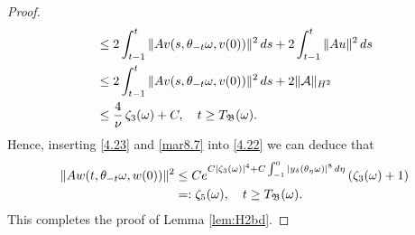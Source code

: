 \documentclass[10pt,a4paper]{amsart}
\renewcommand{\d}{{\rm{d}}}
\begin{document}
\begin{proof}
\begin{align}
&\leq2\int_{t-1}^t\|A\textbf{v}(s,\theta_{-t}\omega,\textbf{v}(0))\|^2\, \d s+2\int_{t-1}^t\|A\textbf{u}\|^2\, \d s\nonumber\\
&\leq  2\int_{t-1}^t \|A\textbf{v}(s,\theta_{-t}\omega,\textbf{v}(0))\|^2\, \d s  +  2\|\mathcal A \|_{H^2} \nonumber\\
&\leq \frac 4  \nu \, \zeta_3(\omega) +C ,  \quad t\geq T_{\mathfrak B}(\omega).  \label{mar8.7}
\end{align}
Hence, inserting \eqref{4.23} and \eqref{mar8.7} into \eqref{4.22} we can deduce that
\begin{align}
\|Aw(t,\theta_{-t}\omega,w(0))\|^2
&\leq C e^{C|\zeta_3(\omega) |^4 + C\int^0_{-1} |y_\delta(\theta_{\eta}\omega) |^8
\, \d \eta} \left(   \zeta_3(\omega) +1
\right)  \nonumber \\
&=:\zeta_5(\omega),  \quad t\geq T_{\mathfrak B}(\omega).  \nonumber
\end{align}
 This completes the proof of Lemma \ref{lem:H2bd}.
\end{proof}
\end{document}
